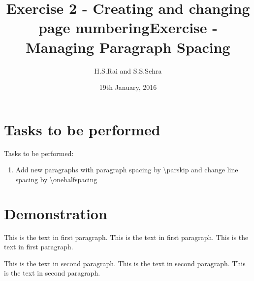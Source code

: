 \documentclass{article}
\title{Exercise 2 - Creating and changing page numbering}
\title{Exercise - Managing Paragraph Spacing}
\author{H.S.Rai and S.S.Sehra}
\date{19th January, 2016}
\begin{document}
	\maketitle
	\doublespacing
	
	\section*{Tasks to be performed}
	Tasks to be performed:
	\begin{enumerate}
		\item Add new paragraphs with paragraph spacing by \textbackslash parskip and change line spacing by \textbackslash onehalfspacing
	\end{enumerate}
	\section*{Demonstration}

	This is the text in first paragraph. This is the text in first 
	paragraph. This is the text in first paragraph. \par
	This is the text in second paragraph. This is the text in second 
	paragraph. This is the text in second paragraph.
\end{document}
